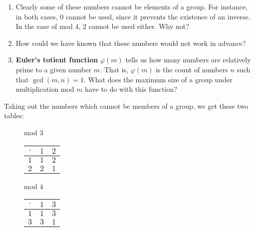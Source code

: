 \documentclass[../textbook.tex]{subfiles}
\begin{document}
\begin{enumerate}
\item Clearly some of these numbers cannot be elements of a group. For instance, in both cases, $0$ cannot be used, since it prevents the existence of an inverse. In the case of mod $4$, $2$ cannot be used either. Why not?
\item How could we have known that these numbers would not work in advance?
\item \textbf{Euler's totient function} $\varphi(m)$ tells us how many numbers are relatively prime to a given number $m$. That is, $\varphi(m)$ is the count of numbers $n$ such that $\gcd(m,n)=1$. What does the maximum size of a group under multiplication mod $m$ have to do with this function?
\setcounter{problem_i}{\value{enumi}}
\end{enumerate}

\noindent Taking out the numbers which cannot be members of a group, we get these two tables:

\begin{figure}[h]
	\begin{center}
		\begin{minipage}[t]{0.45\textwidth}
			\centering
			mod $3$ \\
			\vspace*{0.5\baselineskip}
			\begin{tabular}{c|cc}
				\hline
				$\cdot$ & $1$ & $2$ \\ \hline
				\rowcolor{light-gray}
				$1$ & $1$ & $2$ \\
				$2$ & $2$ & $1$ \\ \hline
			\end{tabular}
			\vspace*{0.5\baselineskip}
		\end{minipage}
		\hfill
		\begin{minipage}[t]{0.45\textwidth}
			\centering
			mod $4$ \\
			\vspace*{0.5\baselineskip}
			\begin{tabular}{c|cc}
				\hline
				$\cdot$ & $1$ & $3$ \\ \hline
				\rowcolor{light-gray}
				$1$ & $1$ & $3$ \\
				$3$ & $3$ & $1$ \\ \hline
			\end{tabular}
			\vspace*{0.5\baselineskip}
		\end{minipage}
	\end{center}
	\vspace*{-2\baselineskip}
\end{figure}
\end{document}

